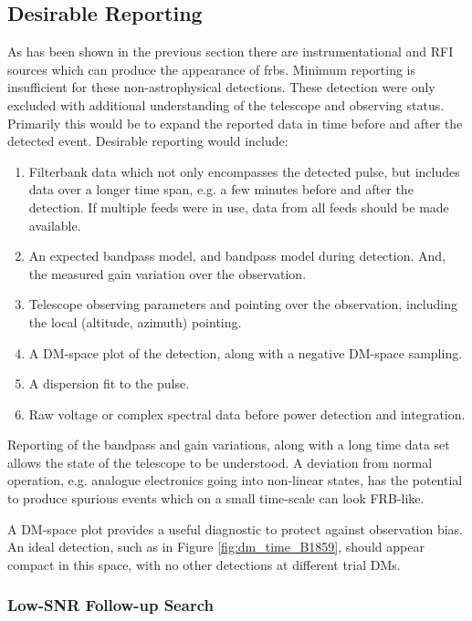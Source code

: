 \documentclass[a4paper,fleqn,usenatbib]{mnras}
\begin{document}
\subsection{Desirable Reporting}

As has been shown in the previous section there are instrumentational and RFI
sources which can produce the appearance of \glspl{frb}. Minimum reporting is
insufficient for these non-astrophysical detections. These detection were only
excluded with additional understanding of the telescope and observing status.
Primarily this would be to expand the reported data in time before and after the
detected event. Desirable reporting would include:

\begin{enumerate}
    \item Filterbank data which not only encompasses the detected pulse, but
    includes data over a longer time span, e.g. a few minutes before and after
    the detection. If multiple feeds were in use, data from all feeds should be
    made available.
    \item An expected bandpass model, and bandpass model during detection. And,
    the measured gain variation over the observation.
    \item Telescope observing parameters and pointing over the observation,
    including the local (altitude, azimuth) pointing.
    \item A DM-space plot of the detection, along with a negative DM-space
    sampling.
    \item A dispersion fit to the pulse.
    \item Raw voltage or complex spectral data before power detection and
    integration.
\end{enumerate}

Reporting of the bandpass and gain variations, along with a long time data set
allows the state of the telescope to be understood. A deviation from normal
operation, e.g. analogue electronics going into non-linear states, has the
potential to produce spurious events which on a small time-scale can look
FRB-like.

A DM-space plot provides a useful diagnostic to protect against observation
bias. An ideal detection, such as in Figure \ref{fig:dm_time_B1859}, should
appear compact in this space, with no other detections at different trial DMs.

\subsubsection{Low-SNR Follow-up Search}
\end{document}

